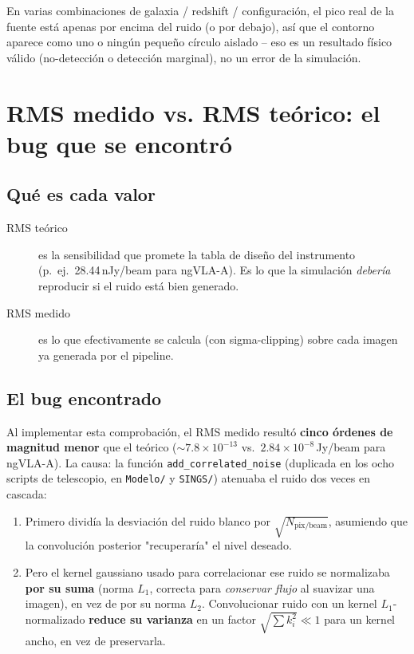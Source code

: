 \documentclass[12pt, a4paper]{article}
\begin{document}
En varias combinaciones de galaxia / redshift / configuración, el pico real
de la fuente está apenas por encima del ruido (o por debajo), así que el
contorno aparece como uno o ningún pequeño círculo aislado -- eso es un
resultado físico válido (no-detección o detección marginal), no un error de
la simulación.

\section{RMS medido vs. RMS teórico: el bug que se encontró}

\subsection{Qué es cada valor}

\begin{description}
    \item[\textcolor{azulms}{RMS teórico}] es la sensibilidad que promete
        la tabla de diseño del instrumento (p.\ ej.\ 28.44\,nJy/beam para
        ngVLA-A). Es lo que la simulación \textit{debería} reproducir si el
        ruido está bien generado.
    \item[\textcolor{rojoquench}{RMS medido}] es lo que efectivamente se
        calcula (con sigma-clipping) sobre cada imagen ya generada por el
        pipeline.
\end{description}

\subsection{El bug encontrado}

Al implementar esta comprobación, el RMS medido resultó \textbf{cinco órdenes
de magnitud menor} que el teórico ($\sim 7.8\times10^{-13}$ vs.\
$2.84\times10^{-8}$\,Jy/beam para ngVLA-A). La causa: la función
\texttt{add\_correlated\_noise} (duplicada en los ocho scripts de telescopio,
en \texttt{Modelo/} y \texttt{SINGS/}) atenuaba el ruido dos veces en
cascada:

\begin{enumerate}
    \item Primero dividía la desviación del ruido blanco por
          $\sqrt{N_{\mathrm{pix/beam}}}$, asumiendo que la convolución
          posterior "recuperaría" el nivel deseado.
    \item Pero el kernel gaussiano usado para correlacionar ese ruido se
          normalizaba \textbf{por su suma} (norma $L_1$, correcta para
          \textit{conservar flujo} al suavizar una imagen), en vez de por su
          norma $L_2$. Convolucionar ruido con un kernel $L_1$-normalizado
          \textbf{reduce su varianza} en un factor $\sqrt{\sum k_i^2} \ll 1$
          para un kernel ancho, en vez de preservarla.
\end{enumerate}
\end{document}
